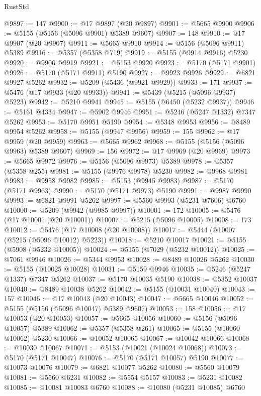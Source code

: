 \begin{lexlean}{RustStd}
\begin{coremodule}
@9897 := 147
@9900 := @17 @9897 (@20 @9897)
@9901 := @5665 @9900
@9906 := @5155 (@5156 (@5096 @9901) @5389 @9607)
@9907 := 148
@9910 := @17 @9907 (@20 @9907)
@9911 := @5665 @9910
@9914 := @5156 (@5096 @9911) @5389
@9916 := @5357 (@5358 @719)
@9919 := @5155 (@9914 @9916) @5230
@9920 := @9906 @9919
@9921 := @5153 @9920
@9923 := @5170 (@5171 @9901)
@9926 := @5170 (@5171 @9911) @5190
@9927 := @9923 @9926
@9929 := @6821 @9927 @5262
@9932 := @5209 (@5436 (@9921 @9929))
@9933 := 171
@9937 := @5476 (@17 @9933 (@20 @9933))
@9941 := @5439 (@5215 (@5096 @9937) @5223)
@9942 := @5210 @9941
@9945 := @5155 (@6450 (@5232 @9937))
@9946 := @5161 @4334
@9947 := @5902 @9946
@9951 := @5246 (@5247 @1332) @7347 @5262
@9953 := @5170 @9951 @5190
@9954 := @5348 @9953
@9956 := @8489 @9954 @5262
@9958 := @5155 (@9947 @9956)
@9959 := 155
@9962 := @17 @9959 (@20 @9959)
@9963 := @5665 @9962
@9968 := @5155 (@5156 (@5096 @9963) @5389 @9607)
@9969 := 156
@9972 := @17 @9969 (@20 @9969)
@9973 := @5665 @9972
@9976 := @5156 (@5096 @9973) @5389
@9978 := @5357 (@5358 @255)
@9981 := @5155 (@9976 @9978) @5230
@9982 := @9968 @9981
@9983 := @9958 @9982
@9985 := @5153 (@9945 @9983)
@9987 := @5170 (@5171 @9963)
@9990 := @5170 (@5171 @9973) @5190
@9991 := @9987 @9990
@9993 := @6821 @9991 @5262
@9997 := @5560 @9993 (@5231 @7606) @6760
@10000 := @5209 (@9942 (@9985 @9997))
@10001 := 172
@10005 := @5476 (@17 @10001 (@20 @10001))
@10007 := @5215 (@5096 @10005)
@10008 := 173
@10012 := @5476 (@17 @10008 (@20 @10008))
@10017 := @5444 (@10007 (@5215 (@5096 @10012) @5223))
@10018 := @5210 @10017
@10021 := @5155 (@5908 (@5232 @10005))
@10024 := @5155 (@7029 (@5232 @10012))
@10025 := @7061 @9946
@10026 := @5344 @9953
@10028 := @8489 @10026 @5262
@10030 := @5155 (@10025 @10028)
@10031 := @5159 @9946
@10035 := @5246 (@5247 @1337) @7347 @5262
@10037 := @5170 @10035 @5190
@10038 := @5352 @10037
@10040 := @8489 @10038 @5262
@10042 := @5155 (@10031 @10040)
@10043 := 157
@10046 := @17 @10043 (@20 @10043)
@10047 := @5665 @10046
@10052 := @5155 (@5156 (@5096 @10047) @5389 @9607)
@10053 := 158
@10056 := @17 @10053 (@20 @10053)
@10057 := @5665 @10056
@10060 := @5156 (@5096 @10057) @5389
@10062 := @5357 (@5358 @261)
@10065 := @5155 (@10060 @10062) @5230
@10066 := @10052 @10065
@10067 := @10042 @10066
@10068 := @10030 @10067
@10071 := @5153 (@10021 (@10024 @10068))
@10073 := @5170 (@5171 @10047)
@10076 := @5170 (@5171 @10057) @5190
@10077 := @10073 @10076
@10079 := @6821 @10077 @5262
@10080 := @5560 @10079
@10081 := @5560 @6231
@10082 := @5554 @5157
@10083 := @5231 @10082
@10085 := @10081 @10083 @6760
@10088 := @10080 (@5231 @10085) @6760

\end{coremodule}
\end{lexlean}
